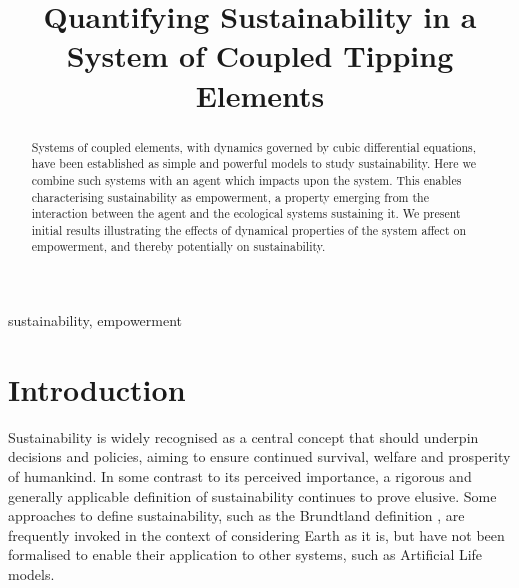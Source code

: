 \documentclass[conference]{IEEEtran}
\begin{document}
\title{Quantifying Sustainability in a System of Coupled Tipping Elements}

\author{
\and
{}
}

\maketitle

\begin{abstract}
Systems of coupled elements, with dynamics governed by cubic
differential equations, have been established as simple and powerful
models to study sustainability. Here we combine such systems with an
agent which impacts upon the system. This enables characterising
sustainability as empowerment, a property emerging from the
interaction between the agent and the ecological systems sustaining
it. We present initial results illustrating the effects of dynamical
properties of the system affect on empowerment, and thereby
potentially on sustainability.
\end{abstract}

\begin{IEEEkeywords}
sustainability, empowerment
\end{IEEEkeywords}


\section{Introduction}

Sustainability is widely recognised as a central concept that should
underpin decisions and policies, aiming to ensure continued survival,
welfare and prosperity of humankind. In some contrast to its perceived
importance, a rigorous and generally applicable definition of
sustainability continues to prove elusive. Some approaches to define
sustainability, such as the Brundtland definition
\cite{Brundlandcommission1987}, are frequently invoked in the context
of considering Earth as it is, but have not been formalised to enable
their application to other systems, such as Artificial Life models.
\end{document}
